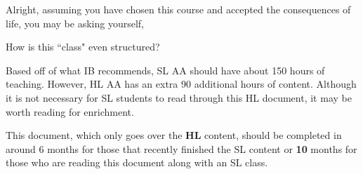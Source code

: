 \documentclass[main.tex]{subfiles}
\begin{document}
Alright, assuming you have chosen this course and accepted the consequences of life, you may be asking yourself,
\begin{center}How is this ``class" even structured?\end{center}

 Based off of what IB recommends, SL AA should have about 150 hours of teaching. However, HL AA has an extra 90 additional hours of content. Although it is not necessary for SL students to read through this HL document, it may be worth reading for enrichment.
 
 This document, which only goes over the \textbf{HL} content, should be completed in around 6 months for those that recently finished the SL content or \textbf{10} months for those who are reading this document along with an SL class.
\end{document}
